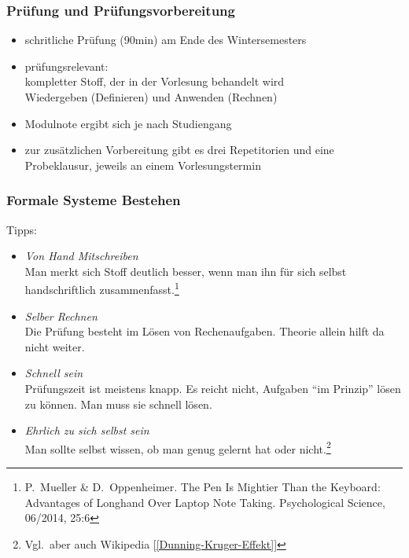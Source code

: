 \documentclass[onlymath]{beamer}
\begin{document}
\begin{frame}\frametitle{Prüfung und Prüfungsvorbereitung}
\begin{itemize}
\item schritliche Prüfung (90min) am Ende des Wintersemesters
\item prüfungsrelevant:\\
	kompletter Stoff, der in der Vorlesung behandelt wird\\
	Wiedergeben (Definieren) \alert{und} Anwenden (Rechnen)
\item Modulnote ergibt sich je nach Studiengang
\item zur zusätzlichen Vorbereitung gibt es \alert{drei Repetitorien} und \alert{eine Probeklausur}, jeweils an einem Vorlesungstermin
\end{itemize}

\end{frame}


\begin{frame}\frametitle{Formale Systeme Bestehen}
Tipps:
\begin{itemize}
\item \emph{Von Hand Mitschreiben}\\
	{\footnotesize Man merkt sich Stoff deutlich besser, wenn man ihn für sich selbst handschriftlich
	zusammenfasst.\footnote{\tiny P.\ Mueller \& D.\ Oppenheimer. The Pen Is Mightier Than the Keyboard: Advantages of Longhand Over Laptop Note Taking. Psychological Science, 06/2014, 25:6}}
\item \emph{Selber Rechnen}\\
	{\footnotesize Die Prüfung besteht im Lösen von Rechenaufgaben. Theorie allein hilft da nicht weiter.}
\item \emph{Schnell sein}\\
	{\footnotesize Prüfungszeit ist meistens knapp. Es reicht nicht, Aufgaben "`im Prinzip"' lösen zu können. Man muss sie schnell lösen.}
\item \emph{Ehrlich zu sich selbst sein}\\
	{\footnotesize Man sollte selbst wissen, ob man genug gelernt hat oder nicht.\footnote{\tiny Vgl.\ aber auch Wikipedia \href{https://de.wikipedia.org/wiki/Dunning-Kruger-Effekt}{[[Dunning-Kruger-Effekt]]}}}
\end{itemize}

\end{frame}



\newcommand{\qaline}[2]{\alert{#1}\\\hfill\pause \textcolor{darkred}{#2}\\[1.5ex]}
\end{document}
